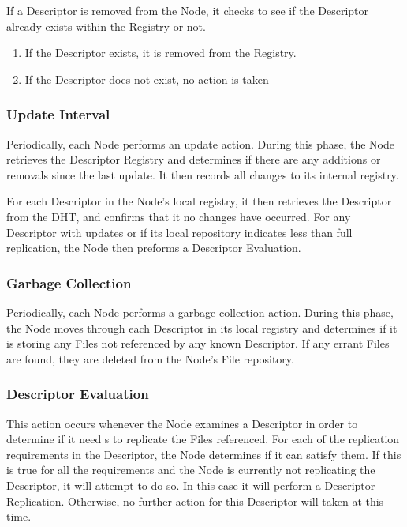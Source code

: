 \documentclass[letterpaper,11pt]{article}
\begin{document}
If a Descriptor is removed from the Node, it checks to see if the Descriptor already exists within the Registry or not.
\begin{enumerate}
\item If the Descriptor exists, it is removed from the Registry.
\item If the Descriptor does not exist, no action is taken
\end{enumerate}

\subsubsection{Update Interval}

Periodically, each Node performs an update action. During this phase, the Node retrieves the Descriptor Registry and determines if there are any additions or removals since the last update. It then records all changes to its internal registry.

For each Descriptor in the Node's local registry, it then retrieves the Descriptor from the DHT, and confirms that it no changes have occurred. For any Descriptor with updates or if its local repository indicates less than full replication, the Node then preforms a Descriptor Evaluation. 

\subsubsection{Garbage Collection}

Periodically, each Node performs a garbage collection action. During this phase, the Node moves through each Descriptor in its local registry and determines if it is storing any Files not referenced by any known Descriptor. If any errant Files are found, they are deleted from the Node's File repository.

\subsubsection{Descriptor Evaluation}

This action occurs whenever the Node examines a Descriptor in order to determine if it need s to replicate the Files referenced. For each of the replication requirements in the Descriptor, the Node determines if it can satisfy them. If this is true for all the requirements and the Node is currently not replicating the Descriptor, it will attempt to do so. In this case it will perform a Descriptor Replication. Otherwise, no further action for this Descriptor will taken at this time.
\end{document}
